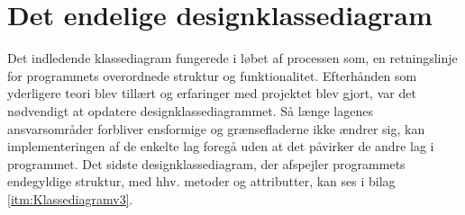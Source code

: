 \section{Det endelige designklassediagram}
Det indledende klassediagram fungerede i løbet af processen som, en retningslinje for programmets overordnede struktur og funktionalitet. Efterhånden som yderligere teori blev tillært og erfaringer med projektet blev gjort, var det nødvendigt at opdatere designklassediagrammet. Så længe lagenes ansvarsområder forbliver ensformige og grænsefladerne ikke ændrer sig, kan implementeringen af de enkelte lag foregå uden at det påvirker de andre lag i programmet. 
Det sidste designklassediagram, der afspejler programmets endegyldige struktur, med hhv. metoder og attributter, kan ses i bilag \ref{itm:Klassediagramv3}.







